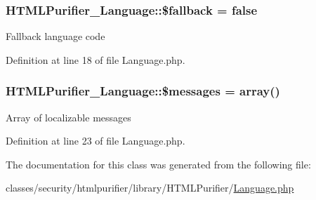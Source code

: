 \hypertarget{classHTMLPurifier__Language_ae37ea0bda359fc0ab33db4d74c267a47}{
\subsubsection[{\$fallback}]{\setlength{\rightskip}{0pt plus 5cm}H\+T\+M\+L\+Purifier\+\_\+\+Language\+::\$fallback = false}}\label{classHTMLPurifier__Language_ae37ea0bda359fc0ab33db4d74c267a47}
Fallback language code 

Definition at line 18 of file Language.\+php.

\hypertarget{classHTMLPurifier__Language_ae0b2a027ff425c9ebefc0e4f2728c7ab}{
\subsubsection[{\$messages}]{\setlength{\rightskip}{0pt plus 5cm}H\+T\+M\+L\+Purifier\+\_\+\+Language\+::\$messages = array()}}\label{classHTMLPurifier__Language_ae0b2a027ff425c9ebefc0e4f2728c7ab}
Array of localizable messages 

Definition at line 23 of file Language.\+php.



The documentation for this class was generated from the following file\+:\begin{DoxyCompactItemize}
\item 
classes/security/htmlpurifier/library/\+H\+T\+M\+L\+Purifier/\hyperlink{Language_8php}{Language.\+php}\end{DoxyCompactItemize}
